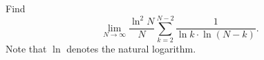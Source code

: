 \documentclass{article}
\begin{document}
	\setlength{\parindent}{0pt}
	Find $$\lim_{N\to\infty}\frac{\ln^2 N}{N}\sum_{k=2}^{N-2}\frac{1}{\ln k\cdot\ln(N-k)}.$$ Note that $\ln$ denotes the natural	logarithm.
\end{document}
